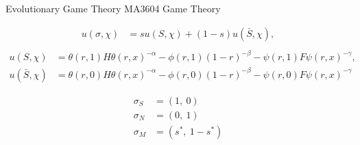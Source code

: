 \documentclass{beamer}
\begin{document}
\begin{frame}
\centering
\Huge Evolutionary Game Theory
\vfill
\large MA3604 Game Theory
\end{frame}

\begin{frame}
\centering

\end{frame}

\begin{frame}
\centering

\end{frame}

\begin{frame}
\centering

\end{frame}

\begin{frame}
\centering

\end{frame}

\begin{frame}
\centering

\end{frame}


\begin{frame}
\begin{equation}
\begin{aligned}
u(\sigma, \chi) & = s u(S,\chi) +(1-s) u(\bar{S},\chi), \\
\end{aligned}
\end{equation}
\vspace{1cm}
\pause
\begin{equation}
\begin{aligned}
u(S,\chi) &= \theta(r,1) H \theta(r,x)^{-\alpha}
- \phi(r,1) (1-r)^{-\beta}
- \psi(r,1) F\psi(r, x)^{-\gamma} ,
\end{aligned}
\end{equation}
\vspace{0.3cm}
\pause
\begin{equation}
\begin{aligned}
u(\bar{S},\chi) &=  \theta(r,0) H \theta(r,x)^{-\alpha}
- \phi(r,0) (1-r)^{-\beta}
- \psi(r,0) F\psi(r, x)^{-\gamma}
\end{aligned}
\end{equation}
\end{frame}

\begin{frame}
\Large
\begin{equation*}
\begin{aligned}
\sigma_S & = (1,\ 0) \\
\sigma_{N} & = (0,\ 1) \\
\sigma_M & = (s^*,\ 1- s^*)
\end{aligned}
\end{equation*}
\end{frame}
\end{document}
